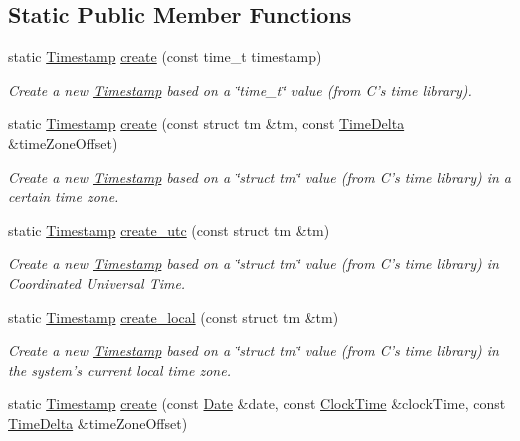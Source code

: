\subsection*{Static Public Member Functions}
\begin{DoxyCompactItemize}
\item 
static \hyperlink{structTimestamp}{Timestamp} \hyperlink{structTimestamp_a050609c408bf55dafa24a080757a471b}{create} (const time\-\_\-t timestamp)
\begin{DoxyCompactList}\small\item\em Create a new \hyperlink{structTimestamp}{Timestamp} based on a \char`\"{}time\-\_\-t\char`\"{} value (from C's time library). \end{DoxyCompactList}\item 
static \hyperlink{structTimestamp}{Timestamp} \hyperlink{structTimestamp_aa5ab499f6e8a649ba6a160593dce9600}{create} (const struct tm \&tm, const \hyperlink{structTimeDelta}{Time\-Delta} \&time\-Zone\-Offset)
\begin{DoxyCompactList}\small\item\em Create a new \hyperlink{structTimestamp}{Timestamp} based on a \char`\"{}struct tm\char`\"{} value (from C's time library) in a certain time zone. \end{DoxyCompactList}\item 
static \hyperlink{structTimestamp}{Timestamp} \hyperlink{structTimestamp_ae1ec817a76d5f43941548b9cccf3bdeb}{create\-\_\-utc} (const struct tm \&tm)
\begin{DoxyCompactList}\small\item\em Create a new \hyperlink{structTimestamp}{Timestamp} based on a \char`\"{}struct tm\char`\"{} value (from C's time library) in Coordinated Universal Time. \end{DoxyCompactList}\item 
static \hyperlink{structTimestamp}{Timestamp} \hyperlink{structTimestamp_ae2d7fea77bd2f2c7ca3343be080dd90f}{create\-\_\-local} (const struct tm \&tm)
\begin{DoxyCompactList}\small\item\em Create a new \hyperlink{structTimestamp}{Timestamp} based on a \char`\"{}struct tm\char`\"{} value (from C's time library) in the system's current local time zone. \end{DoxyCompactList}\item 
static \hyperlink{structTimestamp}{Timestamp} \hyperlink{structTimestamp_a0585a5f7928f6bad9dda69eb5adf99ee}{create} (const \hyperlink{structDate}{Date} \&date, const \hyperlink{structClockTime}{Clock\-Time} \&clock\-Time, const \hyperlink{structTimeDelta}{Time\-Delta} \&time\-Zone\-Offset)

\end{DoxyCompactItemize}
